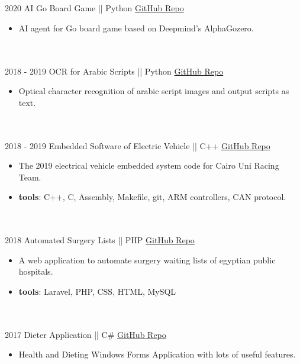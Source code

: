 \documentclass[a4paper]{twentysecondcv} %
\begin{document}
\begin{twenty}
{\begin{itemize}[topsep=0pt,partopsep=0pt]
\end{itemize}} \\\\

\twentyitem
{2020}
{}
{AI Go Board Game || Python}
{\href{https://github.com/JoGo20/Implementation}{GitHub Repo}}
{}
{\vspace{-2mm}\begin{itemize}[topsep=0pt,partopsep=0pt]
\item  AI agent for Go board game based on Deepmind’s AlphaGozero.
\end{itemize}} \\\\

\twentyitem
{2018 - 2019}
{}
{OCR for Arabic Scripts || Python}
{\href{https://github.com/ahmedosama9777/OCR-for-Arabic-Scripts }{GitHub Repo}}
{}
{\vspace{-2mm}\begin{itemize}[topsep=0pt,partopsep=0pt]
\item  Optical character recognition of arabic script images and output scripts as text.
\end{itemize}} \\\\

\twentyitem
{2018 - 2019}
{}
{Embedded Software of Electric Vehicle || C++}
{\href{https://github.com/curtfs/CURTEV-19//}{GitHub Repo}}
{}
{\vspace{-2mm}\begin{itemize}[topsep=0pt,partopsep=0pt]
\item  The 2019 electrical vehicle embedded system code for Cairo Uni Racing Team.
\item \textbf{tools}: C++, C, Assembly, Makefile, git, ARM controllers, CAN protocol.
\end{itemize}} \\\\

\twentyitem
{2018}
{}
{Automated Surgery Lists || PHP}
{\href{https://github.com/curtfs/CURTEV-19//}{GitHub Repo}}
{}
{\vspace{-2mm}\begin{itemize}[topsep=0pt,partopsep=0pt]
\item  A web application to automate surgery waiting lists of egyptian public hospitals.
\item \textbf{tools}: Laravel, PHP, CSS, HTML, MySQL
\end{itemize}} \\\\

\twentyitem
{2017}
{}
{Dieter Application || C\#}
{\href{https://github.com/curtfs/CURTEV-19//}{GitHub Repo}}
{}
{\vspace{-2mm}\begin{itemize}[topsep=0pt,partopsep=0pt]
\item  Health and Dieting Windows Forms Application with lots of useful features.
\end{itemize}} \\\\





      
\end{twenty}
\end{document}

